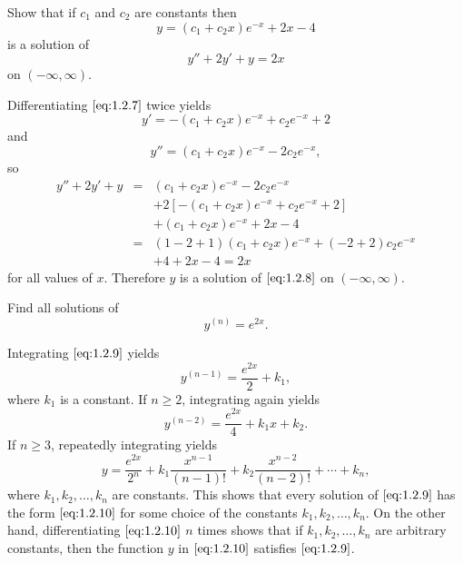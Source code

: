 \documentclass{ximera}
\begin{document}
\begin{example}\label{example:1.2.3}
 Show that if $c_1$ and $c_2$ are constants then
\begin{equation} \label{eq:1.2.7}
y=(c_1+c_2x)e^{-x}+2x-4
\end{equation}
 is a solution of
\begin{equation} \label{eq:1.2.8}
y''+2y'+y=2x
\end{equation}
 on $(-\infty,\infty)$.
 
\begin{explanation}
Differentiating $\eqref{eq:1.2.7}$ twice yields
$$
y'=-(c_1+c_2x)e^{-x}+c_2e^{-x}+2
$$
 and
$$
y''=(c_1+c_2x)e^{-x}-2c_2e^{-x},
$$
so
\begin{eqnarray*}
y''+2y'+y&=&(c_1+c_2x)e^{-x}-2c_2e^{-x}\\
&&+2\left[-(c_1+c_2x)e^{-x}+c_2e^{-x}+2\right]\\
&&+(c_1+c_2x)e^{-x}+2x-4\\
&=&(1-2+1)(c_1+c_2x)e^{-x}+(-2+2)c_2e^{-x}\\ &&+4+2x-4=2x
\end{eqnarray*}
for all values of $x$.
Therefore $y$ is a solution of $\eqref{eq:1.2.8}$ on $(-\infty,\infty)$.
\end{explanation}
\end{example}
 
\begin{example}\label{example:1.2.4}
Find all solutions of
\begin{equation} \label{eq:1.2.9}
y^{(n)}=e^{2x}.
\end{equation}
 
\begin{explanation} Integrating $\eqref{eq:1.2.9}$ yields
$$
y^{(n-1)}=\frac{e^{2x}}{2}+k_1,
$$
 where $k_1$ is a constant. If $n\geq 2$,
integrating again yields
$$
y^{(n-2)}=\frac{e^{2x}}{4}+k_1x+k_2.
$$
If $n\geq 3$, repeatedly integrating yields
\begin{equation} \label{eq:1.2.10}
y=\frac{e^{2x}}{2^n}+k_1\frac{x^{n-1}}{(n-1)!}+k_2\frac{x^{n-2}}{(n-2)!}+\cdots+k_n,
\end{equation}
 where $k_1, k_2, \dots, k_n$ are constants.
This shows that every solution of $\eqref{eq:1.2.9}$ has the form
$\eqref{eq:1.2.10}$
for some choice of the constants $k_1, k_2, \dots, k_n$.
On the other hand, differentiating $\eqref{eq:1.2.10}$  $n$ times shows
that if
$k_1, k_2, \dots, k_n$ are arbitrary constants, then the function $y$
in
$\eqref{eq:1.2.10}$ satisfies $\eqref{eq:1.2.9}$.
\end{explanation}
\end{example}
 
\end{document}
